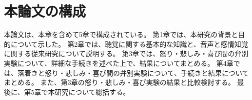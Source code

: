 


\section{本論文の構成}
\label{sec:本論文の構成}
本論文は、本章を含めて5章で構成されている。
第1章では、本研究の背景と目的について示した。
第2章では、聴覚に関する基本的な知識と、音声と感情知覚に関する従来研究について説明する。
第3章では、怒り・悲しみ・喜び間の弁別実験について、詳細な手続きを述べた上で、結果についてまとめる。
第4章では、落着きと怒り・悲しみ・喜び間の弁別実験について、手続きと結果についてまとめる。
また、第3章の怒り・悲しみ・喜び実験の結果と比較検討する。
最後に、第5章で本研究について総括する。


